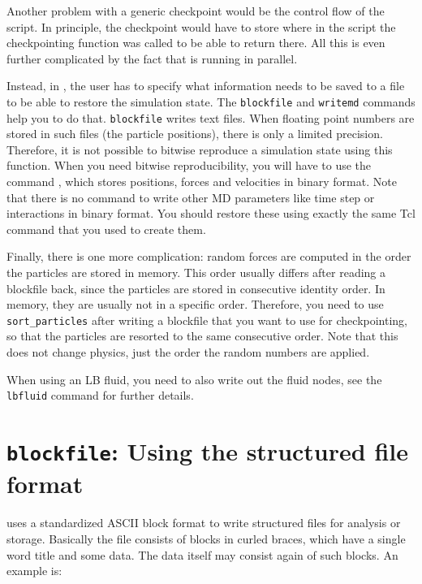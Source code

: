 Another problem with a generic checkpoint would be the control flow of
the script. In principle, the checkpoint would have to store where in
the script the checkpointing function was called to be able to return
there.  All this is even further complicated by the fact that \es is
running in parallel.

Instead, in \es, the user has to specify what information needs to be
saved to a file to be able to restore the simulation state.  The
\texttt{blockfile} and \texttt{writemd} commands help you to do that.
\texttt{blockfile} writes text files.  When floating point numbers are
stored in such files (\eg the particle positions), there is only a
limited precision.  Therefore, it is not possible to bitwise reproduce
a simulation state using this function. When you need bitwise
reproducibility, you will have to use the command , which
stores positions, forces and velocities in binary format.  Note that
there is no command to write other MD parameters like time step or
interactions in binary format. You should restore these using exactly
the same Tcl command that you used to create them.

Finally, there is one more complication: random forces are computed
in the order the particles are stored in memory. This order usually
differs after reading a blockfile back, since the particles are
stored in consecutive identity order. In memory, they are usually
not in a specific order. Therefore, you need to use \texttt{sort_particles}
after writing a blockfile that you want to use for checkpointing, so
that the particles are resorted to the same consecutive order. Note
that this does not change physics, just the order the random numbers
are applied.

When using an LB fluid, you need to also write out the fluid nodes,
see the \texttt{lbfluid} command for further details.

\section{\texttt{blockfile}: Using the structured file format}
\label{sec:structured-file-format}

\es uses a standardized ASCII block format to write structured files
for analysis or storage. Basically the file consists of blocks in
curled braces, which have a single word title and some data. The data
itself may consist again of such blocks. An example is:
\begin{tclcode}
{file {Demonstration of the block format}
{variable epsilon {_dval_ 1} } 
{variable p3m_mesh_offset {_dval_ 5.0000000000e-01
   5.0000000000e-01 5.0000000000e-01 } } 
{variable node_grid {_ival_ 2 2 2 } } 
{end} 
\end{tclcode}

